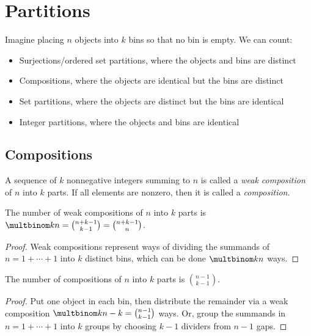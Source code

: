 \documentclass[a4paper]{article}
\begin{document}
\section{Partitions}

\begin{concept}
Imagine placing $n$ objects into $k$ bins so that no bin is empty. We can count:
\begin{itemize}
\item Surjections/ordered set partitions, where the objects and bins are distinct
\item Compositions, where the objects are identical but the bins are distinct
\item Set partitions, where the objects are distinct but the bins are identical
\item Integer partitions, where the objects and bins are identical
\end{itemize}
\end{concept}

\subsection{Compositions}

\begin{definition}
A sequence of $k$ nonnegative integers summing to $n$ is called a \emph{weak composition} of $n$ into $k$ parts. If all elements are nonzero, then it is called a \emph{composition}.
\end{definition}

\begin{theorem}
The number of weak compositions of $n$ into $k$ parts is $\multbinom kn=\binom{n+k-1}{k-1}=\binom{n+k-1}n$.

\begin{hl}
\begin{proof}
Weak compositions represent ways of dividing the summands of $n=1+\cdots+1$ into $k$ distinct bins, which can be done $\multbinom kn$ ways.
\end{proof}
\end{hl}
\end{theorem}

\begin{theorem}
The number of compositions of $n$ into $k$ parts is $\binom{n-1}{k-1}$.

\begin{hl}
\begin{proof}
Put one object in each bin, then distribute the remainder via a weak composition $\multbinom k{n-k}=\binom{n-1}{k-1}$ ways. Or, group the summands in $n=1+\cdots+1$ into $k$ groups by choosing $k-1$ dividers from $n-1$ gaps.
\end{proof}
\end{hl}
\end{theorem}
\end{document}
